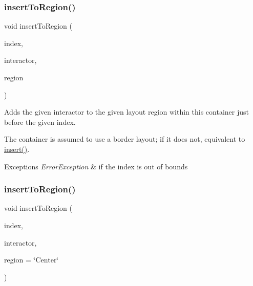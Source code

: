 \subsubsection{\texorpdfstring{insert\+To\+Region()}{insertToRegion()}\hspace{0.1cm}{\footnotesize\ttfamily [3/4]}}
{\footnotesize\ttfamily void insert\+To\+Region (\begin{DoxyParamCaption}\item[{int}]{index,  }\item[{\mbox{\hyperlink{classsgl_1_1GInteractor}{G\+Interactor}} \&}]{interactor,  }\item[{\mbox{\hyperlink{classsgl_1_1GContainer_a81a01a86de31071a92e6cce0bab9bc4b}{Region}}}]{region }\end{DoxyParamCaption})\hspace{0.3cm}{\ttfamily [virtual]}}



Adds the given interactor to the given layout region within this container just before the given index. 

The container is assumed to use a border layout; if it does not, equivalent to \mbox{\hyperlink{classsgl_1_1GContainer_afffb8f789ff9a8466fbae5b846a0ebe7}{insert()}}. 
\begin{DoxyExceptions}{Exceptions}
{\em Error\+Exception} & if the index is out of bounds \\
\hline
\end{DoxyExceptions}
\mbox{\label{classsgl_1_1GContainer_ad4d413f64a3e4fb948956e7249c10110}} 
\subsubsection{\texorpdfstring{insert\+To\+Region()}{insertToRegion()}\hspace{0.1cm}{\footnotesize\ttfamily [4/4]}}
{\footnotesize\ttfamily void insert\+To\+Region (\begin{DoxyParamCaption}\item[{int}]{index,  }\item[{\mbox{\hyperlink{classsgl_1_1GInteractor}{G\+Interactor}} \&}]{interactor,  }\item[{const std\+::string \&}]{region = {\ttfamily \char`\"{}Center\char`\"{}} }\end{DoxyParamCaption})\hspace{0.3cm}{\ttfamily [virtual]}}



